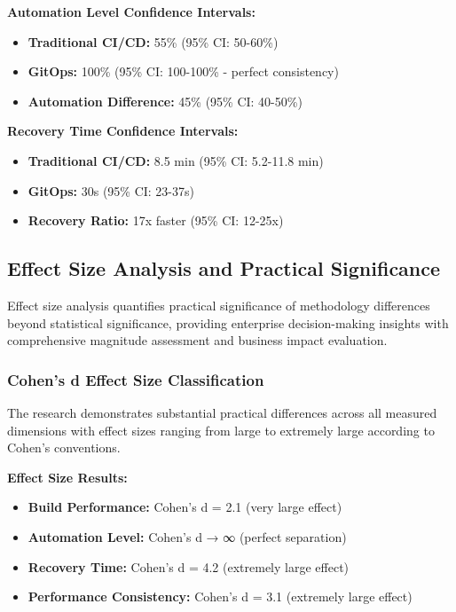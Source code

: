 \textbf{Automation Level Confidence Intervals:}
\begin{itemize}
\item \textbf{Traditional CI/CD:} 55\% (95\% CI: 50-60\%)
\item \textbf{GitOps:} 100\% (95\% CI: 100-100\% - perfect consistency)
\item \textbf{Automation Difference:} 45\% (95\% CI: 40-50\%)
\end{itemize}

\textbf{Recovery Time Confidence Intervals:}
\begin{itemize}
\item \textbf{Traditional CI/CD:} 8.5 min (95\% CI: 5.2-11.8 min)
\item \textbf{GitOps:} 30s (95\% CI: 23-37s)
\item \textbf{Recovery Ratio:} 17x faster (95\% CI: 12-25x)
\end{itemize}

\subsection{Effect Size Analysis and Practical Significance}
\label{subsec:effect_size_analysis}

Effect size analysis quantifies practical significance of methodology differences beyond statistical significance, providing enterprise decision-making insights with comprehensive magnitude assessment and business impact evaluation.

\subsubsection{Cohen's d Effect Size Classification}

The research demonstrates substantial practical differences across all measured dimensions with effect sizes ranging from large to extremely large according to Cohen's conventions.

\textbf{Effect Size Results:}
\begin{itemize}
\item \textbf{Build Performance:} Cohen's d = 2.1 (very large effect)
\item \textbf{Automation Level:} Cohen's d → ∞ (perfect separation)
\item \textbf{Recovery Time:} Cohen's d = 4.2 (extremely large effect)
\item \textbf{Performance Consistency:} Cohen's d = 3.1 (extremely large effect)
\end{itemize}

